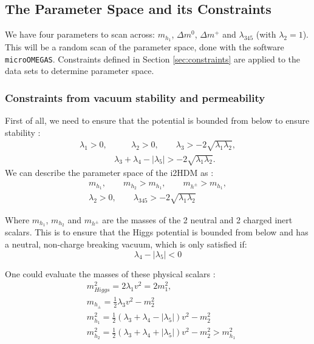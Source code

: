 \documentclass[12pt]{article}
\begin{document}
\subsection{The Parameter Space and its Constraints}
We have four parameters to scan across: $m_{h_1}$, $\Delta m^0$, $\Delta m^+$ and $\lambda_{345}$ (with $\lambda_2 = 1$). This will be a random scan of the parameter space, done with the software \verb|microOMEGAS|. Constraints defined in Section \ref{sec:constraints} are applied to the data sets to determine parameter space.
\label{sec:constraints}
\subsubsection{Constraints from vacuum stability and permeability}
First of all, we need to ensure that the potential is bounded from below to ensure stability \cite{Deshpande:1977rw}:
\begin{equation}
    \begin{split}
    \lambda_1>0,& \qquad
    \lambda_2>0, \qquad
    \lambda_3> -2 \sqrt{ \lambda_1 \lambda_2}, \\
    &\lambda_3 + \lambda_4 - |\lambda_5| > -2 \sqrt{ \lambda_1 \lambda_2}.
    \end{split}
    \label{eq:potential_stability}
\end{equation}
We can describe the parameter space of the i2HDM as \cite{Belyaev:2016lok}:
\begin{equation}
    \begin{split}
        m_{h_1}, \qquad m_{h_2} > m_{h_1}, \qquad m_{h^\pm} > m_{h_1}, \\
        \lambda_2 > 0, \qquad \lambda_{345} > -2\sqrt{\lambda_1 \lambda_2}
    \end{split}
\end{equation}

Where $m_{h_1}$, $m_{h_2}$ and $m_{h^\pm}$ are the masses of the 2 neutral and 2 charged inert scalars. This is to ensure that the Higgs potential is bounded from below and has a neutral, non-charge breaking vacuum, which is only satisfied if:
\begin{equation}
    \lambda_4 - |\lambda_5| < 0
\end{equation}

One could evaluate the masses of these physical scalars \cite{Belyaev:2016lok}:
\begin{align}
    \label{eqn:scalar_equations}
    &m_{Higgs}^2 = 2\lambda_1v^2 = 2m^2_1,\\
    &m_{h_\pm} = \frac{1}{2}\lambda_3v^2-m^2_2 \\
    \label{eqn:massdmscalar}
    &m_{h_1}^2 = \frac{1}{2}(\lambda_3 + \lambda_4 - |\lambda_5|)v^2 - m_2^2\\
    &m_{h_2}^2 = \frac{1}{2}(\lambda_3 + \lambda_4 + |\lambda_5|)v^2 - m_2^2 > m^2_{h_1}
\end{align}
\end{document}
